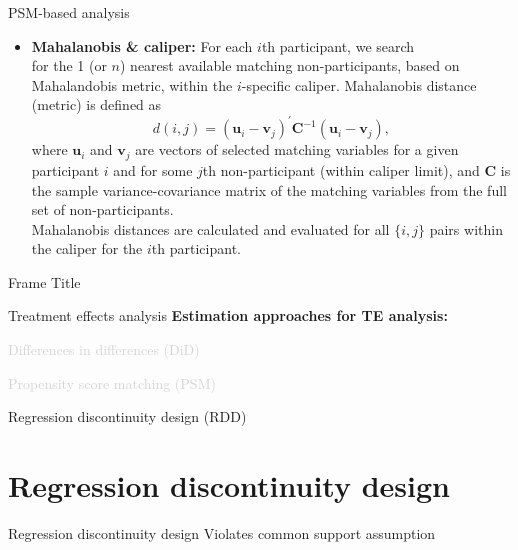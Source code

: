 \documentclass{beamer}
\begin{document}
\begin{frame}{PSM-based analysis}
\begin{itemize}
    \item \textbf{Mahalanobis \& caliper:} For each $i$th participant, we search \\for the 1 (or $n$) nearest available matching non-participants, based on Mahalandobis metric, within the $i$-specific caliper. Mahalanobis distance (metric) is defined as
    $$
    d(i,j) = (\bm{u}_i - \bm{v}_j)^{\prime} 
    \bm{C}^{-1} (\bm{u}_i - \bm{v}_j),
    $$
    where $\bm{u}_i$ and $\bm{v}_j$ are vectors of selected matching variables for a given participant $i$ and for some $j$th non-participant (within caliper limit), and $\bm{C}$ is the sample variance-covariance matrix of the matching variables from the full set of non-participants. \\ \medskip Mahalanobis distances are calculated and evaluated for all $\{i,j\}$ pairs within the caliper for the $i$th participant.
\end{itemize}
\end{frame}
% 
\begin{frame}{Frame Title}
    
\end{frame}
\begin{frame}{Treatment effects analysis}
\textbf{Estimation approaches for TE analysis:}\\
\bigskip
\begin{enumerate}
    \item \textcolor{lightgray}{Differences in differences (DiD)
    \bigskip
    \item Propensity score matching (PSM)}
    \bigskip
    \item Regression discontinuity design (RDD)
\end{enumerate}
\end{frame}
\section{Regression discontinuity design}
\begin{frame}{Regression discontinuity design}
    Violates common support assumption
\end{frame}
\end{document}
